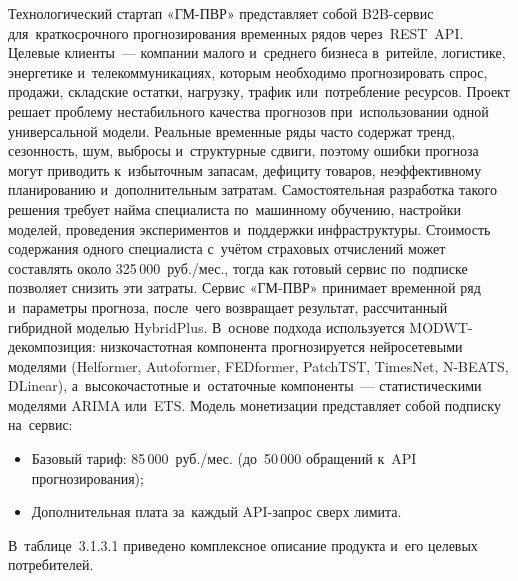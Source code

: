 Технологический стартап «ГМ-ПВР» представляет собой B2B-сервис
для~краткосрочного прогнозирования временных рядов через~REST~API. Целевые
клиенты~--- компании малого и~среднего бизнеса в~ритейле, логистике,
энергетике и~телекоммуникациях, которым необходимо прогнозировать спрос,
продажи, складские остатки, нагрузку, трафик или~потребление ресурсов.
Проект решает проблему нестабильного качества прогнозов при~использовании
одной универсальной модели. Реальные временные ряды часто содержат тренд,
сезонность, шум, выбросы и~структурные сдвиги, поэтому ошибки прогноза могут
приводить к~избыточным запасам, дефициту товаров, неэффективному планированию
и~дополнительным затратам.
Самостоятельная разработка такого решения требует найма специалиста
по~машинному обучению, настройки моделей, проведения экспериментов
и~поддержки инфраструктуры. Стоимость содержания одного специалиста с~учётом
страховых отчислений может составлять около 325\,000~руб./мес., тогда как
готовый сервис по~подписке позволяет снизить эти затраты.
Сервис «ГМ-ПВР» принимает временной ряд и~параметры прогноза, после~чего
возвращает результат, рассчитанный гибридной моделью HybridPlus. В~основе
подхода используется MODWT-декомпозиция: низкочастотная компонента
прогнозируется нейросетевыми моделями (Helformer, Autoformer, FEDformer,
PatchTST, TimesNet, N-BEATS, DLinear), а~высокочастотные и~остаточные
компоненты~--- статистическими моделями ARIMA или~ETS.
Модель монетизации представляет собой подписку на~сервис:

\begin{itemize}[nosep]
  \item Базовый тариф: 85\,000~руб./мес. (до~50\,000 обращений к~API прогнозирования);
  \item Дополнительная плата за~каждый API-запрос сверх лимита.
\end{itemize}

В~таблице~3.1.3.1 приведено комплексное описание продукта и~его целевых
потребителей.

